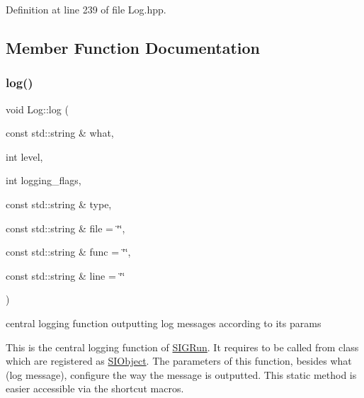 Definition at line 239 of file Log.\+hpp.



\subsection{Member Function Documentation}
\mbox{\label{class_log_aa761204a7477ab8376b7ccf4e9b4e801}} 
\subsubsection{\texorpdfstring{log()}{log()}}
{\footnotesize\ttfamily void Log\+::log (\begin{DoxyParamCaption}\item[{const std\+::string \&}]{what,  }\item[{int}]{level,  }\item[{int}]{logging\+\_\+flags,  }\item[{const std\+::string \&}]{type,  }\item[{const std\+::string \&}]{file = {\ttfamily \char`\"{}\char`\"{}},  }\item[{const std\+::string \&}]{func = {\ttfamily \char`\"{}\char`\"{}},  }\item[{const std\+::string \&}]{line = {\ttfamily \char`\"{}\char`\"{}} }\end{DoxyParamCaption})\hspace{0.3cm}{\ttfamily [static]}}



central logging function outputting log messages according to its params 

This is the central logging function of \mbox{\hyperlink{class_s_i_g_run}{S\+I\+G\+Run}}. It requires to be called from class which are registered as \mbox{\hyperlink{class_s_i_object}{S\+I\+Object}}. The parameters of this function, besides what (log message), configure the way the message is outputted. This static method is easier accessible via the shortcut macros.


